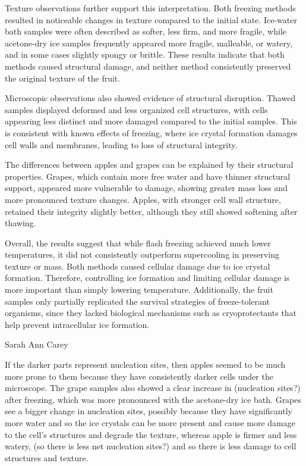 Texture observations further support this interpretation. Both freezing
methods resulted in noticeable changes in texture compared to the
initial state. Ice-water bath samples were often described as softer,
less firm, and more fragile, while acetone-dry ice samples frequently
appeared more fragile, malleable, or watery, and in some cases slightly
spongy or brittle. These results indicate that both methods caused
structural damage, and neither method consistently preserved the
original texture of the fruit.

Microscopic observations also showed evidence of structural disruption.
Thawed samples displayed deformed and less organized cell structures,
with cells appearing less distinct and more damaged compared to the
initial samples. This is consistent with known effects of freezing,
where ice crystal formation damages cell walls and membranes, leading to
loss of structural integrity.

The differences between apples and grapes can be explained by their
structural properties. Grapes, which contain more free water and have
thinner structural support, appeared more vulnerable to damage, showing
greater mass loss and more pronounced texture changes. Apples, with
stronger cell wall structure, retained their integrity slightly better,
although they still showed softening after thawing.

Overall, the results suggest that while flash freezing achieved much
lower temperatures, it did not consistently outperform supercooling in
preserving texture or mass. Both methods caused cellular damage due to
ice crystal formation. Therefore, controlling ice formation and limiting
cellular damage is more important than simply lowering temperature.
Additionally, the fruit samples only partially replicated the survival
strategies of freeze-tolerant organisms, since they lacked biological
mechanisms such as cryoprotectants that help prevent intracellular ice
formation.

Sarah Ann Carey

If the darker parts represent nucleation sites, then apples seemed to be
much more prone to them because they have consistently darker cells
under the microscope. The grape samples also showed a clear increase in
(nucleation sites?) after freezing, which was more pronounced with the
acetone-dry ice bath. Grapes see a bigger change in nucleation sites,
possibly because they have significantly more water and so the ice
crystals can be more present and cause more damage to the cell's
structures and degrade the texture, whereas apple is firmer and less
watery, (so there is less net nucleation sites?) and so there is less
damage to cell structures and texture.

